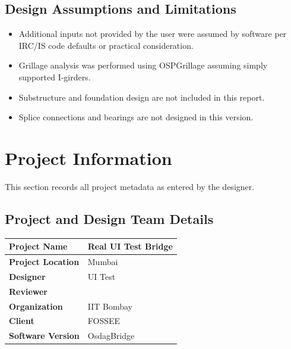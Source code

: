 \documentclass[12pt,a4paper]{report}
\numberwithin{table}{chapter}
\numberwithin{figure}{chapter}
\begin{document}
\section*{Design Assumptions and Limitations}
\label{sec:assumptions}

\begin{itemize}
\item Additional inputs not provided by the user were assumed by software per IRC/IS code defaults or practical consideration.
\item Grillage analysis was performed using OSPGrillage assuming simply supported I-girders.
\item Substructure and foundation design are not included in this report.
\item Splice connections and bearings are not designed in this version.
\end{itemize}

\titleformat{\chapter}[block]{\normalfont\Large\bfseries\centering}{\thechapter}{1em}{}
\titlespacing*{\chapter}{0pt}{-30pt}{10pt}


\chapter{Project Information}

This section records all project metadata as entered by the designer.

\section{Project and Design Team Details}
\label{sec:project-details}

\vspace{0.4cm}
\begin{tabular}{|L{5.5cm}|L{8.5cm}|}
\hline
\textbf{Project Name} & Real UI Test Bridge \\
\hline
\textbf{Project Location} & Mumbai \\
\hline
\textbf{Designer} & UI Test \\
\hline
\textbf{Reviewer} &  \\
\hline
\textbf{Organization} & IIT Bombay \\
\hline
\textbf{Client} & FOSSEE \\
\hline
\textbf{Software Version} & OsdagBridge \\
\hline
\end{tabular}
\end{document}
